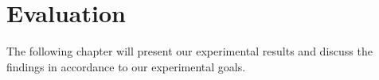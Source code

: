 
\chapter{Evaluation}
\label{chap:resulteval}
\minitoc

The following chapter will present our experimental results and discuss the findings
in accordance to our experimental goals.

\clearpage


